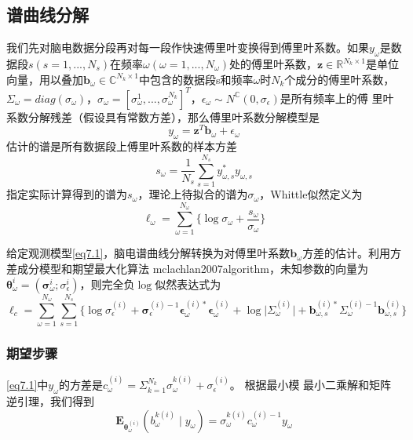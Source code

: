 \subsection{谱曲线分解}
我们先对脑电数据分段再对每一段作快速傅里叶变换得到傅里叶系数。如果$y_\omega$是数据段$s(s=1,...,N_s)$在频率$\omega(\omega=1,...,N_\omega)$处的傅里叶系数，$\mathbf{z}\in{\mathbb{R}^{N_k\times{1}}}$是单位向量，用以叠加$\mathbf{b}_\omega\in{\mathbb{C}^{N_k\times{1}}}$中包含的数据段s和频率$\omega$时$N_k$个成分的傅里叶系数，$\Sigma_\omega=diag(\sigma_\omega)$，$\sigma_\omega=[\sigma_\omega^1,...,\sigma_\omega^{N_k}]^T$，$\epsilon_\omega\sim{N^\mathbb{C}(0,\sigma_\epsilon)}$是所有频率上的傅
里叶系数分解残差（假设具有常数方差），那么傅里叶系数分解模型是
\begin{equation}\label{eq7.1}
y_\omega=\mathbf{z}^T\mathbf{b}_\omega+\epsilon_\omega
\end{equation}
估计的谱是所有数据段上傅里叶系数的样本方差
\begin{equation}\label{eq7.2}
s_\omega=\frac{1}{N_s}\sum_{s=1}^{N_s}y_{\omega,s}^*y_{\omega,s}
\end{equation}
指定实际计算得到的谱为$s_\omega$，理论上待拟合的谱为$\sigma_\omega$，Whittle似然定义为
\begin{equation}\label{eq7.3}
\ell_\omega=\sum_{\omega=1}^{N_\omega}\lbrace\log{\sigma_\omega}+\frac{s_\omega}{\sigma_\omega}\rbrace
\end{equation}

给定观测模型\eqref{eq7.1}，脑电谱曲线分解转换为对傅里叶系数$\mathbf{b}_\omega$方差的估计。利用方差成分模型和期望最大化算法\citing
{mclachlan2007algorithm}，未知参数的向量为$\mathbf{\theta}_\omega^{i}=(\mathbf{\sigma}_\omega^{i};\sigma_\epsilon^{i})$，则完全负$\log$似然表达式为
\begin{equation}\label{eq7.4}
\ell_c=\sum_{\omega=1}^{N_\omega}\sum_{s=1}^{N_s}\lbrace\log{\sigma}_\epsilon^{(i)}+\mathbf{\sigma}_\epsilon^{(i)-1}\mathbf{\epsilon}_\omega^{(i)*}\mathbf{\epsilon}_\omega^{(i)}+\log\lvert\Sigma_\omega^{(i)}\rvert+\mathbf{b}_{\omega,s}^{(i)*}\Sigma_\omega^{(i)-1}\mathbf{b}_{\omega,s}^{(i)}\rbrace
\end{equation}

\subsubsection{期望步骤}
\eqref{eq7.1}中$y_\omega$的方差是$c_\omega^{(i)}=\Sigma_{k=1}^{N_k}\sigma_\omega^{k(i)}+\sigma_\epsilon^{(i)}$。 根据最小模
最小二乘解和矩阵逆引理，我们得到
\begin{equation}\label{eq7.5}
\mathbf{E}_{\mathbf{\theta}_\omega^{(i)}}(b_\omega^{k(i)}\mid{y}_\omega)=\sigma_\omega^{k(i)}c_\omega^{(i)-1}y_\omega
\end{equation}

